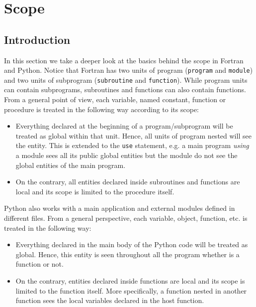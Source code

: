 \chapter{Scope} 
    \vspace{-1cm}
    \section{Introduction}

In this section we take a deeper look at the basics behind the scope in Fortran and Python. 
Notice that Fortran has two units of program (\texttt{program} and \texttt{module}) and 
two units of subprogram (\texttt{subroutine} and \texttt{function}).
While program units can contain subprograms, subroutines and functions can also contain functions. 
From a general point of view, each variable, named constant, function or procedure is treated in the following way according to its scope:
\vspace{-0.5cm}
\begin{itemize}[noitemsep]
    \item Everything declared at the beginning of a program/subprogram will be treated as global within that unit. 
    Hence, all units of program nested will see the entity.
    This is extended to the \texttt{use} statement, e.g. a main program \textit{using} a module sees all its public global entities but the module do not see the global entities of the main program. 
    
    \item On the contrary, all entities declared inside subroutines and functions are local and its scope is limited to the procedure itself. 
\end{itemize}

Python also works with a main application and external modules defined in different files. 
From a general perspective, each variable, object, function, etc. is treated in the following way:
\vspace{-0.5cm}
\begin{itemize}[noitemsep]
    \item Everything declared in the main body of the Python code will be treated as global. 
    Hence, this entity is seen throughout all the program whether is a function or not.
    
    \item On the contrary, entities declared inside functions are local and its scope is limited to the function itself. 
    More specifically, a function nested in another function sees the local variables declared in the host function.
\end{itemize}
    


